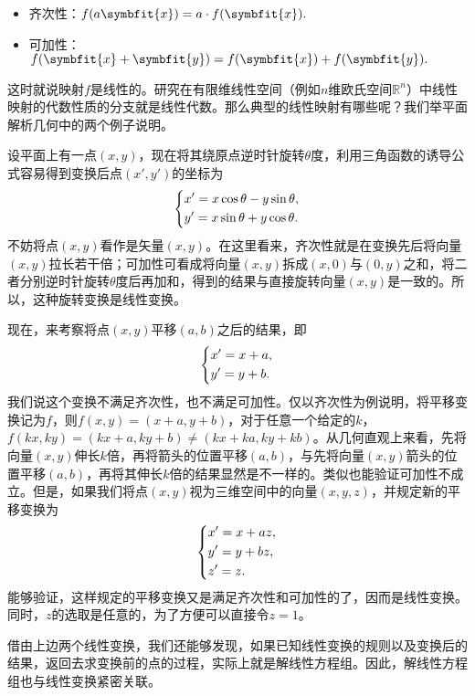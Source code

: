 \begin{itemize}
	\item 齐次性：$f(a\symbfit{x})=a\cdot f(\symbfit{x}).$

	\item 可加性：$f(\symbfit{x}+\symbfit{y})=f(\symbfit{x})+ f(\symbfit{y}).$
\end{itemize}

这时就说映射$f$是线性的。研究在有限维线性空间（例如$n$维欧氏空间$\mathbb{R}^n$）中线性映射的代数性质的分支就是线性代数。那么典型的线性映射有哪些呢？我们举平面解析几何中的两个例子说明。

设平面上有一点$(x,y)$，现在将其绕原点逆时针旋转$\theta$度，利用三角函数的诱导公式容易得到变换后点$(x',y')$的坐标为
\[
	\begin{dcases}
		x'=x\cos \theta -y\sin \theta, \\
		y'=x\sin \theta +y\cos \theta .
	\end{dcases}
\]
不妨将点$(x,y)$看作是矢量$(x,y)$。在这里看来，齐次性就是在变换先后将向量$(x,y)$拉长若干倍；可加性可看成将向量$(x,y)$拆成$(x,0)$与$(0,y)$之和，将二者分别逆时针旋转$\theta$度后再加和，得到的结果与直接旋转向量$(x,y)$是一致的。所以，这种旋转变换是线性变换。

现在，来考察将点$(x,y)$平移$(a,b)$之后的结果，即
\[
	\begin{dcases}
		x'=x+a,  \\
		y'=y+b . \\
	\end{dcases}
\]
我们说这个变换不满足齐次性，也不满足可加性。仅以齐次性为例说明，将平移变换记为$f$，则$f(x,y)=(x+a,y+b)$，对于任意一个给定的$k$，$f(kx,ky)=(kx+a,ky+b)\ne (kx+ka,ky+kb)$。从几何直观上来看，先将向量$(x,y)$伸长$k$倍，再将箭头的位置平移$(a,b)$，与先将向量$(x,y)$箭头的位置平移$(a,b)$，再将其伸长$k$倍的结果显然是不一样的。类似也能验证可加性不成立。但是，如果我们将点$(x,y)$视为三维空间中的向量$(x,y,z)$，并规定新的平移变换为
\[
	\begin{dcases}
		x'=x+az, \\
		y'=y+bz, \\
		z'=z   . \\
	\end{dcases}
\]
能够验证，这样规定的平移变换又是满足齐次性和可加性的了，因而是线性变换。同时，$z$的选取是任意的，为了方便可以直接令$z=1$。

借由上边两个线性变换，我们还能够发现，如果已知线性变换的规则以及变换后的结果，返回去求变换前的点的过程，实际上就是解线性方程组。因此，解线性方程组也与线性变换紧密关联。

